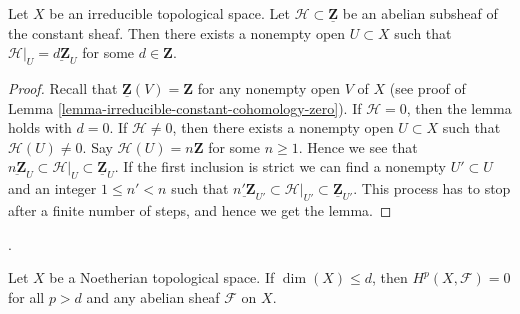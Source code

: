 \begin{lemma}
\label{lemma-subsheaf-irreducible}
Let $X$ be an irreducible topological space.
Let $\mathcal{H} \subset \underline{\mathbf{Z}}$ be
an abelian subsheaf of the constant sheaf.
Then there exists a nonempty open $U \subset X$ such
that $\mathcal{H}|_U = \underline{d\mathbf{Z}}_U$
for some $d \in \mathbf{Z}$.
\end{lemma}

\begin{proof}
Recall that $\underline{\mathbf{Z}}(V) = \mathbf{Z}$
for any nonempty open $V$ of $X$ (see proof of
Lemma \ref{lemma-irreducible-constant-cohomology-zero}).
If $\mathcal{H} = 0$, then the lemma holds with $d = 0$.
If $\mathcal{H} \not = 0$, then there exists a nonempty open
$U \subset X$ such that $\mathcal{H}(U) \not = 0$.
Say $\mathcal{H}(U) = n\mathbf{Z}$ for some $n \geq 1$.
Hence we see that
$\underline{n\mathbf{Z}}_U
\subset \mathcal{H}|_U \subset
\underline{\mathbf{Z}}_U$. If the first inclusion is strict we
can find a nonempty $U' \subset U$ and an integer $1 \leq n' < n$
such that
$\underline{n'\mathbf{Z}}_{U'}
\subset \mathcal{H}|_{U'} \subset
\underline{\mathbf{Z}}_{U'}$.
This process has to stop after a finite number of steps, and
hence we get the lemma.
\end{proof}

\begin{proposition}[Grothendieck]
\label{proposition-vanishing-Noetherian}
\begin{reference}
\cite[Theorem 3.6.5]{Tohoku}.
\end{reference}
Let $X$ be a Noetherian topological space.
If $\dim(X) \leq d$, then $H^p(X, \mathcal{F}) = 0$
for all $p > d$ and any abelian sheaf $\mathcal{F}$
on $X$.
\end{proposition}


